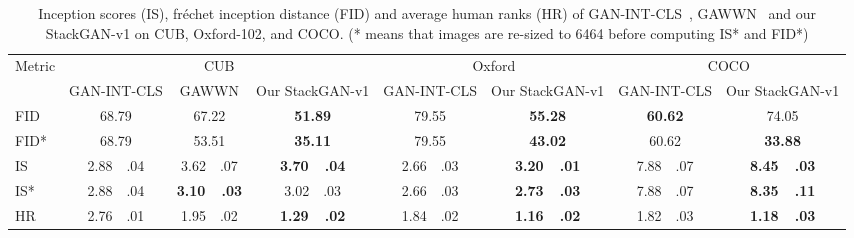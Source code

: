 \documentclass[10pt,journal,letterpaper,compsoc]{IEEEtran}
\begin{document}
\begin{table*}[bt]
\begin{center}
\normalfont
\begin{tabular}{|l|c|c|c|c|c|c|c|}
\hline
\multirow{2}{2.8em}{Metric} & \multicolumn{3}{c|}{CUB} &\multicolumn{2}{c|}{Oxford}  &\multicolumn{2}{c|}{COCO}\\
\cline{2-8}
& GAN-INT-CLS & GAWWN & Our StackGAN-v1 
& GAN-INT-CLS & Our StackGAN-v1 &
GAN-INT-CLS & Our StackGAN-v1 \\
\hline
FID~ &68.79 &67.22 &\bf51.89 &79.55 &\bf55.28 &\bf60.62 &74.05 \\
\hline
FID*~ &68.79 &53.51 &\bf35.11 &79.55 &\bf43.02 &60.62 &\bf33.88 \\
\hline
IS~  &2.88~~.04 &3.62~~.07 &\bf3.70~~.04
    &2.66~~.03 &\bf3.20~~.01
    &7.88~~.07 &\bf8.45~~.03\\
\hline
IS*~ &2.88~~.04 &\bf3.10~~.03 &3.02~~.03 
     &2.66~~.03 &\bf2.73~~.03
     &7.88~~.07 &\bf8.35~~.11\\
\hline
HR~  &2.76~~.01 &1.95~~.02 &\bf1.29~~.02
&1.84~~.02 &\bf1.16~~.02
&1.82~~.03 &\bf1.18~~.03\\
\hline
\end{tabular}
\end{center}
\vspace{-8pt}
    \caption{Inception scores (IS), fr\'echet inception distance (FID) and average human ranks (HR) of GAN-INT-CLS~\cite{reed2016generative}, GAWWN~\cite{reed2016learning} and our StackGAN-v1 on CUB, Oxford-102, and COCO. (* means that images are re-sized to 6464 before computing IS* and FID*)}
\vspace{+10pt}
\label{tab:cmp_previous}



\end{table*}
\end{document}
